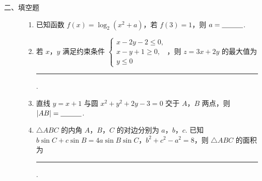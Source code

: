\begin{description}

    \item[二、填空题]

    \begin{enumerate}[leftmargin=5pt]

      \addtocounter{enumi}{+12}

        \item 已知函数 \(f(x)=\log_2(x^2+a)\)，若 \(f(3)=1\)，则 \(a=\rule[-0.3ex]{3em}{0.4pt}\).

        \item 若 \(x\)，\(y\) 满足约束条件 \(\begin{cases}
x-2y-2\le0,\\
x-y+1\ge0,\\
y\le0
\end{cases}\)，则 \(z=3x+2y\) 的最大值为\rule[-0.3ex]{3em}{0.4pt}.

        \item 直线 \(y=x+1\) 与圆 \(x^2+y^2+2y-3=0\) 交于 \(A\)，\(B\) 两点，则 \(|AB|=\rule[-0.3ex]{3em}{0.4pt}\).

        \item \(\triangle ABC\) 的内角 \(A\)，\(B\)，\(C\) 的对边分别为 \(a\)，\(b\)，\(c\). 已知 \(b\sin C+c\sin B=4a\sin B\sin C\)，\(b^2+c^2-a^2=8\)，则 \(\triangle ABC\) 的面积为\rule[-0.3ex]{3em}{0.4pt}.

    \end{enumerate}

\end{description}

